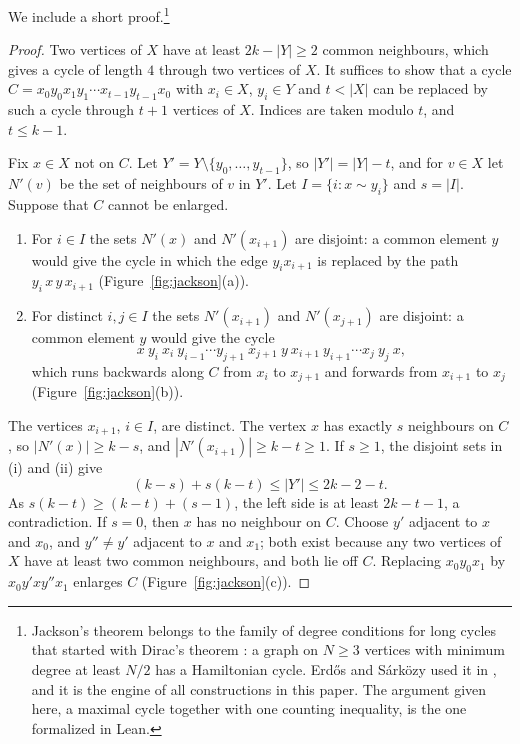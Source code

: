 \documentclass[11pt,a4paper]{article}
\theoremstyle{definition}
\theoremstyle{remark}
\begin{document}
We include a short proof.\footnote{Jackson's theorem belongs to the family of degree conditions for
long cycles that started with Dirac's theorem \cite{Dirac52}: a graph on $N\ge3$ vertices with
minimum degree at least $N/2$ has a Hamiltonian cycle. Erd\H{o}s and S\'ark\"ozy used
it in \cite{ES97}, and it is the engine of all constructions in this paper. The argument given here,
a maximal cycle together with one counting inequality, is the one formalized in Lean.}

\begin{proof}
Two vertices of $X$ have at least $2k-|Y|\ge2$ common neighbours, which gives a cycle of length $4$
through two vertices of $X$. It suffices to show that a cycle
$C=x_0y_0x_1y_1\cdots x_{t-1}y_{t-1}x_0$ with $x_i\in X$, $y_i\in Y$ and $t<|X|$ can be replaced by
such a cycle through $t+1$ vertices of $X$. Indices are taken modulo $t$, and $t\le k-1$.

Fix $x\in X$ not on $C$. Let $Y'=Y\setminus\{y_0,\dots,y_{t-1}\}$, so $|Y'|=|Y|-t$, and for $v\in X$
let $N'(v)$ be the set of neighbours of $v$ in $Y'$. Let $I=\{i:x\sim y_i\}$ and $s=|I|$. Suppose that
$C$ cannot be enlarged.
\begin{enumerate}[label=(\roman*), nosep]
\item For $i\in I$ the sets $N'(x)$ and $N'(x_{i+1})$ are disjoint: a common element $y$ would give the
cycle in which the edge $y_ix_{i+1}$ is replaced by the path $y_i\,x\,y\,x_{i+1}$
(Figure~\ref{fig:jackson}(a)).
\item For distinct $i,j\in I$ the sets $N'(x_{i+1})$ and $N'(x_{j+1})$ are disjoint: a common element
$y$ would give the cycle
\[
  x\ y_i\ x_i\ y_{i-1}\cdots y_{j+1}\ x_{j+1}\ y\ x_{i+1}\ y_{i+1}\cdots x_j\ y_j\ x,
\]
which runs backwards along $C$ from $x_i$ to $x_{j+1}$ and forwards from $x_{i+1}$ to $x_j$
(Figure~\ref{fig:jackson}(b)).
\end{enumerate}
The vertices $x_{i+1}$, $i\in I$, are distinct. The vertex $x$ has exactly $s$ neighbours on $C$, so
$|N'(x)|\ge k-s$, and $|N'(x_{i+1})|\ge k-t\ge1$. If $s\ge1$, the disjoint sets in (i) and (ii) give
\[
  (k-s)+s(k-t)\le|Y'|\le2k-2-t .
\]
As $s(k-t)\ge(k-t)+(s-1)$, the left side is at least $2k-t-1$, a contradiction. If $s=0$, then $x$ has
no neighbour on $C$. Choose $y'$ adjacent to $x$ and $x_0$, and $y''\ne y'$ adjacent to $x$ and
$x_1$; both exist because any two vertices of $X$ have at least two common neighbours, and both lie
off $C$. Replacing $x_0y_0x_1$ by $x_0y'xy''x_1$ enlarges $C$ (Figure~\ref{fig:jackson}(c)).
\end{proof}
\end{document}
